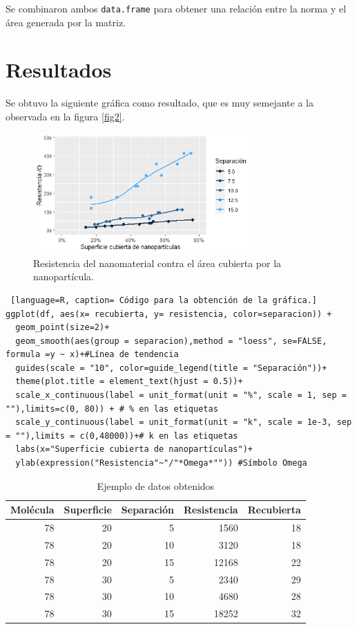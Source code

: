 \documentclass{elsarticle}
\begin{document}
Se combinaron ambos \texttt{data.frame} para obtener una relación entre la norma y el área generada por la matriz.

\section{Resultados}

Se obtuvo la siguiente gráfica como resultado, que es muy semejante a la observada en la figura \ref{fig2}.


\begin{figure} [h!]%
\renewcommand{\figurename}{Gráfica}
    \centering
    \caption{ Resistencia del nanomaterial contra el área cubierta por la nanopartícula.}
    \label{grafica1}
    \includegraphics[width=85mm]{grafica1.png} %
\end{figure}

\begin{lstlisting} [language=R, caption= Código para la obtención de la gráfica.] 
ggplot(df, aes(x= recubierta, y= resistencia, color=separacion)) + 
  geom_point(size=2)+
  geom_smooth(aes(group = separacion),method = "loess", se=FALSE, formula =y ~ x)+#Línea de tendencia
  guides(scale = "10", color=guide_legend(title = "Separación"))+
  theme(plot.title = element_text(hjust = 0.5))+
  scale_x_continuous(label = unit_format(unit = "%", scale = 1, sep = ""),limits=c(0, 80)) + # % en las etiquetas 
  scale_y_continuous(label = unit_format(unit = "k", scale = 1e-3, sep = ""),limits = c(0,48000))+# k en las etiquetas
  labs(x="Superficie cubierta de nanopartículas")+
  ylab(expression("Resistencia"~"/"*Omega*"")) #Símbolo Omega

\end{lstlisting}

\begin{table}[h!]
\centering
\caption{Ejemplo de datos obtenidos}
\label{tabla2}
\begin{tabular}{|r|r|r|r|r|}
\hline
\multicolumn{1}{|c|}{\textbf{Molécula}} & \multicolumn{1}{c|}{\textbf{Superficie}} & \multicolumn{1}{c|}{\textbf{Separación}} & \multicolumn{1}{c|}{\textbf{Resistencia}} & \multicolumn{1}{c|}{\textbf{Recubierta}} \\ \hline
78 & 20 & 5 & 1560 & 18 \\ \hline
78 & 20 & 10 & 3120 & 18 \\ \hline
78 & 20 & 15 & 12168 & 22 \\ \hline
78 & 30 & 5 & 2340 & 29 \\ \hline
78 & 30 & 10 & 4680 & 28 \\ \hline
78 & 30 & 15 & 18252 & 32 \\ \hline
\end{tabular}
\end{table}
\end{document}

